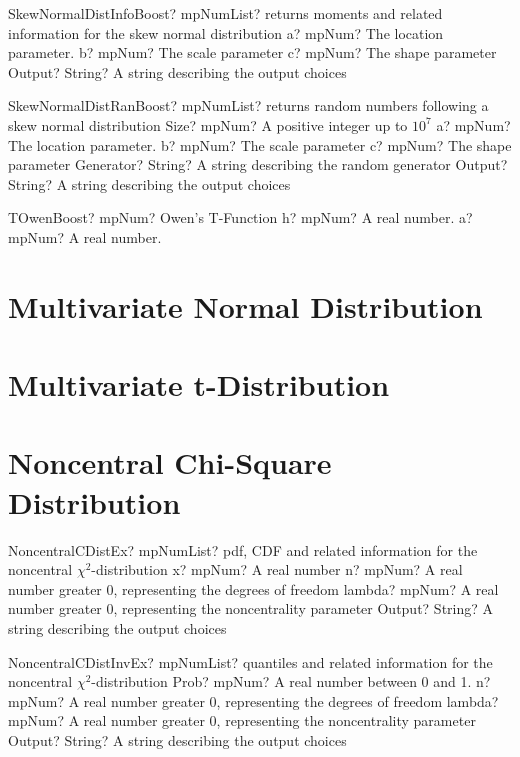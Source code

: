 \documentclass[12pt,a4paper,openany]{book}
\begin{document}
\begin{mpFunctionsExtract}
\mpFunctionFourNotImplemented
{SkewNormalDistInfoBoost? mpNumList? returns moments and related information for the skew normal distribution}
{a? mpNum? The location parameter.}
{b? mpNum? The scale parameter}
{c? mpNum? The shape parameter}
{Output? String? A string describing the output choices}
\end{mpFunctionsExtract}

\begin{mpFunctionsExtract}
\mpFunctionSixNotImplemented
{SkewNormalDistRanBoost? mpNumList? returns random numbers following a skew normal distribution}
{Size? mpNum? A positive integer up to $10^7$}
{a? mpNum? The location parameter.}
{b? mpNum? The scale parameter}
{c? mpNum? The shape parameter}
{Generator? String? A string describing the random generator}
{Output? String? A string describing the output choices}
\end{mpFunctionsExtract}

\begin{mpFunctionsExtract}
\mpFunctionTwo
{TOwenBoost? mpNum? Owen's T-Function}
{h? mpNum? A real number.}
{a? mpNum? A real number.}
\end{mpFunctionsExtract}

\section{Multivariate Normal Distribution}

\section{Multivariate t-Distribution}

\section{Noncentral Chi-Square Distribution}

\begin{mpFunctionsExtract}
\mpFunctionFourNotImplemented
{NoncentralCDistEx? mpNumList? pdf, CDF and related information for the noncentral $\chi^2$-distribution}
{x? mpNum? A real number}
{n? mpNum? A real number greater 0, representing the degrees of freedom}
{lambda? mpNum? A real number greater 0, representing the noncentrality parameter}
{Output? String? A string describing the output choices}
\end{mpFunctionsExtract}

\begin{mpFunctionsExtract}
\mpFunctionFourNotImplemented
{NoncentralCDistInvEx? mpNumList? quantiles and related information for the noncentral $\chi^2$-distribution}
{Prob? mpNum? A real number between 0 and 1.}
{n? mpNum? A real number greater 0, representing the degrees of freedom}
{lambda? mpNum? A real number greater 0, representing the noncentrality parameter}
{Output? String? A string describing the output choices}
\end{mpFunctionsExtract}
\end{document}
